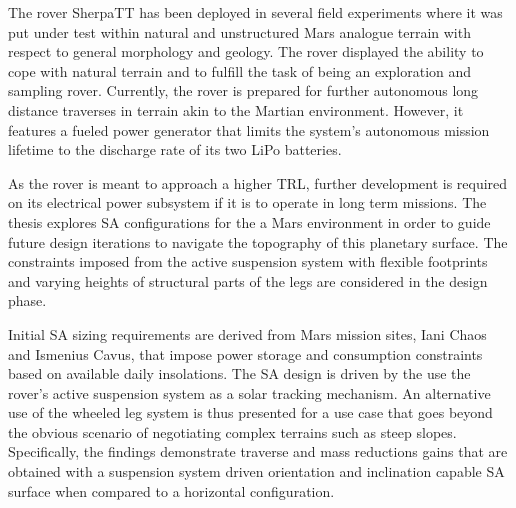 The rover SherpaTT has been deployed in several field experiments where it was put under test within natural and unstructured Mars analogue terrain with respect to general morphology and geology. The rover displayed the ability to cope with natural terrain and to fulfill the task of being an exploration and sampling rover. Currently, the rover is prepared for further autonomous long distance traverses in terrain akin to the Martian environment. However, it features a fueled power generator that limits the system's autonomous mission lifetime to the discharge rate of its two LiPo batteries.

As the rover is meant to approach a higher \ac{TRL}, further development is required on its electrical power subsystem if it is to operate in long term missions. The thesis explores \ac{SA} configurations for the a Mars environment in order to guide future design iterations to navigate the topography of this planetary surface. The constraints imposed from the active suspension system with flexible footprints and varying heights of structural parts of the legs are considered in the design phase.

Initial \ac{SA} sizing requirements are derived from Mars mission sites, Iani Chaos and Ismenius Cavus, that impose power storage and consumption constraints based on available daily insolations. The \ac{SA} design is driven by the use the rover's active suspension system as a solar tracking mechanism. An alternative use of the wheeled leg system is thus presented for a use case that goes beyond the obvious scenario of negotiating complex terrains such as steep slopes. Specifically, the findings demonstrate traverse and mass reductions gains that are obtained with a suspension system driven orientation and inclination capable \ac{SA} surface when compared to a horizontal configuration.
